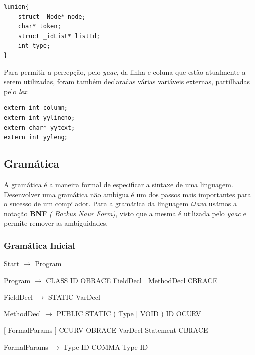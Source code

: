 \documentclass[12pt]{article}
\begin{document}
\begin{lstlisting}
%union{
    struct _Node* node;
    char* token;
    struct _idList* listId;
    int type;
}
\end{lstlisting}   

\par Para permitir a percepção, pelo \emph{yaac}, da linha e coluna que estão atualmente a serem utilizadas, foram também declaradas várias variáveis externas, partilhadas pelo \emph{lex}.
\lstset{language=c,caption=Variáveis externas,label=Estruturas2}
\begin{lstlisting}
extern int column;
extern int yylineno;
extern char* yytext;
extern int yyleng;
\end{lstlisting}  


\subsection{Gramática}

A gramática é a maneira formal de especificar a sintaxe de uma linguagem. 
Desenvolver uma gramática não ambígua é um dos passos mais importantes para o sucesso de um compilador. Para a gramática da linguagem \emph{iJava} usámos a notação \textbf{BNF} \emph{( Backus Naur Form)}, visto que a mesma é utilizada pelo \emph{yaac} e permite remover as ambiguidades. 


\subsubsection{Gramática Inicial}

\vspace{0.5cm}

\hspace{-1cm}Start $\rightarrow$ Program

\hspace{-1cm}Program $\rightarrow$ CLASS ID OBRACE { FieldDecl $\mid$ MethodDecl } CBRACE

\hspace{-1cm}FieldDecl $\rightarrow$ STATIC VarDecl

\hspace{-1cm}MethodDecl $\rightarrow$ PUBLIC STATIC ( Type $\mid$ VOID ) ID OCURV

[ FormalParams ] CCURV OBRACE { VarDecl } { Statement } CBRACE

\hspace{-1cm}FormalParams $\rightarrow$ Type ID { COMMA Type ID }
\end{document}
